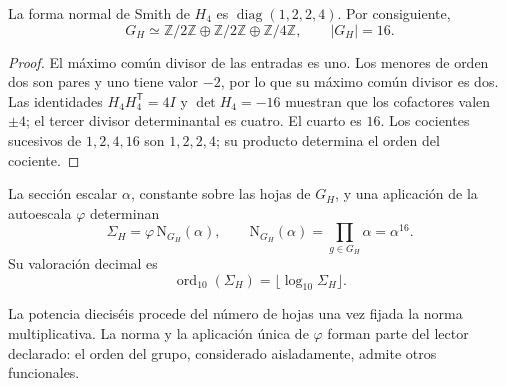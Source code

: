 \begin{lemma}
\label{x_reciprocidad:iv:action:smith}
La forma normal de Smith de \(H_4\) es
\(\operatorname{diag}(1,2,2,4)\). Por consiguiente,
\[
 G_H\simeq\mathbb Z/2\mathbb Z\oplus\mathbb Z/2\mathbb Z
       \oplus\mathbb Z/4\mathbb Z,\qquad |G_H|=16.
\]
\end{lemma}
\begin{proof}
El máximo común divisor de las entradas es uno. Los menores de
orden dos son pares y uno tiene valor \(-2\), por lo que su máximo
común divisor es dos. Las identidades
\(H_4H_4^{\mathsf T}=4I\) y \(\det H_4=-16\) muestran que los
cofactores valen \(\pm4\); el tercer divisor determinantal es
cuatro. El cuarto es \(16\). Los cocientes sucesivos de
\(1,2,4,16\) son \(1,2,2,4\); su producto determina el orden
del cociente.
\end{proof}

\begin{definition}
\label{x_reciprocidad:iv:action:norma}
La sección escalar \(\alpha\), constante sobre las hojas de \(G_H\),
y una aplicación de la autoescala \(\varphi\) determinan
\begin{equation}
 \Sigma_H=\varphi\,\mathrm N_{G_H}(\alpha),\qquad
 \mathrm N_{G_H}(\alpha)=\prod_{g\in G_H}\alpha=\alpha^{16}.
 \label{x_reciprocidad:iv:action:sigma}
\end{equation}
Su valoración decimal es
\[
 \operatorname{ord}_{10}(\Sigma_H)
   =\lfloor\log_{10}\Sigma_H\rfloor.
\]
\end{definition}
La potencia dieciséis procede del número de hojas una vez fijada
la norma multiplicativa. La norma y la aplicación única de
\(\varphi\) forman parte del lector declarado: el orden del grupo,
considerado aisladamente, admite otros funcionales.

